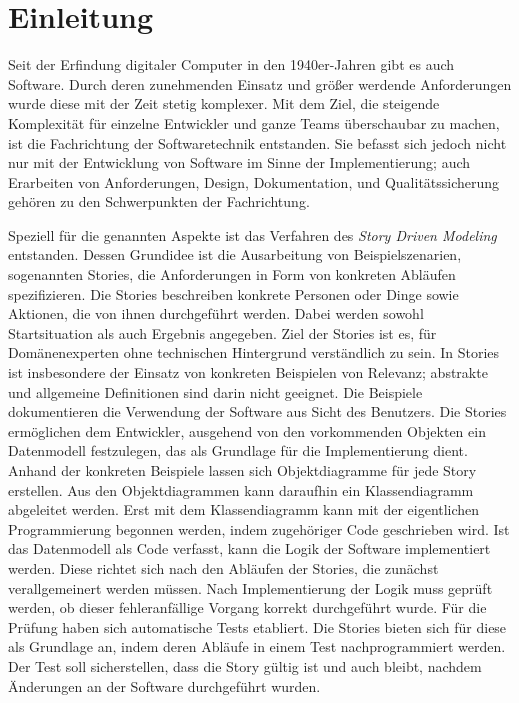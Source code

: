 \chapter{Einleitung}\label{ch:introduction}

Seit der Erfindung digitaler Computer in den 1940er-Jahren gibt es auch Software.
Durch deren zunehmenden Einsatz und größer werdende Anforderungen wurde diese mit der Zeit stetig komplexer.
Mit dem Ziel, die steigende Komplexität für einzelne Entwickler und ganze Teams überschaubar zu machen, ist die Fachrichtung der Softwaretechnik entstanden.
Sie befasst sich jedoch nicht nur mit der Entwicklung von Software im Sinne der Implementierung;
auch Erarbeiten von Anforderungen, Design, Dokumentation, und Qualitätssicherung gehören zu den Schwerpunkten der Fachrichtung.

Speziell für die genannten Aspekte ist das Verfahren des \emph{Story Driven Modeling}~\cite{sdm} entstanden.
Dessen Grundidee ist die Ausarbeitung von Beispielszenarien, sogenannten Stories, die Anforderungen in Form von konkreten Abläufen spezifizieren.
Die Stories beschreiben konkrete Personen oder Dinge sowie Aktionen, die von ihnen durchgeführt werden.
Dabei werden sowohl Startsituation als auch Ergebnis angegeben.
Ziel der Stories ist es, für Domänenexperten ohne technischen Hintergrund verständlich zu sein.
In Stories ist insbesondere der Einsatz von konkreten Beispielen von Relevanz;
abstrakte und allgemeine Definitionen sind darin nicht geeignet.
Die Beispiele dokumentieren die Verwendung der Software aus Sicht des Benutzers.
Die Stories ermöglichen dem Entwickler, ausgehend von den vorkommenden Objekten ein Datenmodell festzulegen, das als Grundlage für die Implementierung dient.
Anhand der konkreten Beispiele lassen sich Objektdiagramme für jede Story erstellen.
Aus den Objektdiagrammen kann daraufhin ein Klassendiagramm abgeleitet werden.
Erst mit dem Klassendiagramm kann mit der eigentlichen Programmierung begonnen werden, indem zugehöriger Code geschrieben wird.
Ist das Datenmodell als Code verfasst, kann die Logik der Software implementiert werden.
Diese richtet sich nach den Abläufen der Stories, die zunächst verallgemeinert werden müssen.
Nach Implementierung der Logik muss geprüft werden, ob dieser fehleranfällige Vorgang korrekt durchgeführt wurde.
Für die Prüfung haben sich automatische Tests etabliert.
Die Stories bieten sich für diese als Grundlage an, indem deren Abläufe in einem Test nachprogrammiert werden.
Der Test soll sicherstellen, dass die Story gültig ist und auch bleibt, nachdem Änderungen an der Software durchgeführt wurden.

